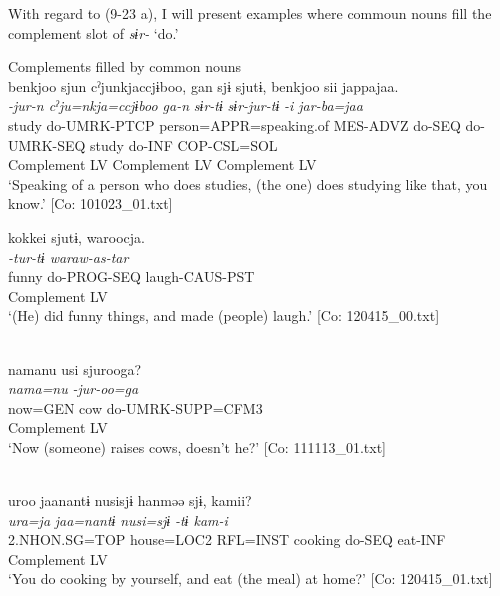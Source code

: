 With regard to (9-23 a), I will present examples where commoun nouns fill the complement slot of \textit{sɨr-} ‘do.’

\ea   Complements filled by common nouns \label{ex:9.24}
\ea{}\\
 \gllll    {\textbar}benkjoo{\textbar}  sjun  cˀjunkjaccjɨboo,  gan  sjɨ  sjutɨ,  {\textbar}benkjoo{\textbar}  sii  jappajaa.\\
      \textit{}  \textit{-jur-n  cˀju=nkja=ccjɨboo  ga-n}   \textit{sɨr-tɨ}  \textit{sɨr-jur-tɨ}  \textit{}  \textit{-i  jar-ba=jaa}\\
      study  do-UMRK-PTCP  person=APPR=speaking.of  MES-ADVZ  do-SEQ  do-UMRK-SEQ  study  do-INF  COP-CSL=SOL\\
      Complement  LV    Complement                            LV    Complement  LV  \\
      \glt       ‘Speaking of a person who does studies, (the one) does studying like that, you know.’ [Co: 101023\_01.txt]

\ex %
\gllll   {\textbar}kokkei{\textbar}  sjutɨ,  waroocja.\\
      \textit{}  \textit{-tur-tɨ  waraw-as-tar}\\
      funny  do-PROG-SEQ  laugh-CAUS-PST\\
      Complement  LV  \\
      \glt       ‘(He) did funny things, and made (people) laugh.’ [Co: 120415\_00.txt]

\ex\relax  [= (8-61 a)]\\
    \gllll  namanu  usi  sjurooga?\\
      \textit{nama=nu}  \textit{}  \textit{-jur-oo=ga}\\
      now=GEN  cow  do-UMRK-SUPP=CFM3\\
        Complement  LV\\
      \glt       ‘Now (someone) raises cows, doesn’t he?’ [Co: 111113\_01.txt]

\ex\relax [= (6-65 b)]\\
    \gllll  uroo  jaanantɨ  nusisjɨ  hanməə  sjɨ,  kamii?\\
      \textit{ura=ja}  \textit{jaa=nantɨ}  \textit{nusi=sjɨ}  \textit{}  \textit{-tɨ  kam-i}\\
      2.NHON.SG=TOP  house=LOC2  RFL=INST  cooking  do-SEQ  eat-INF\\
            Complement  LV  \\
      \glt       ‘You do cooking by yourself, and eat (the meal) at home?’ [Co: 120415\_01.txt]
    \z
\z

